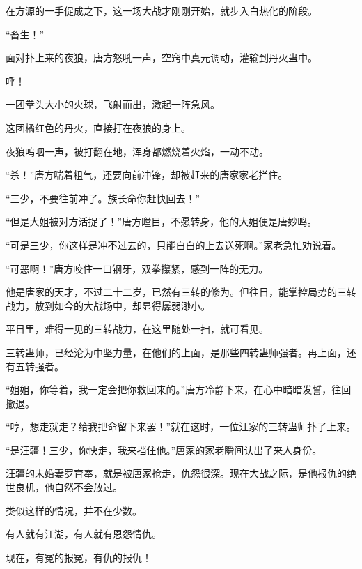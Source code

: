 \begin{this_body}
在方源的一手促成之下，这一场大战才刚刚开始，就步入白热化的阶段。

“畜生！”

面对扑上来的夜狼，唐方怒吼一声，空窍中真元调动，灌输到丹火蛊中。

呼！

一团拳头大小的火球，飞射而出，激起一阵急风。

这团橘红色的丹火，直接打在夜狼的身上。

夜狼呜咽一声，被打翻在地，浑身都燃烧着火焰，一动不动。

“杀！”唐方喘着粗气，还要向前冲锋，却被赶来的唐家家老拦住。

“三少，不要往前冲了。族长命你赶快回去！”

“但是大姐被对方活捉了！”唐方瞠目，不愿转身，他的大姐便是唐妙鸣。

“可是三少，你这样是冲不过去的，只能白白的上去送死啊。”家老急忙劝说着。

“可恶啊！”唐方咬住一口钢牙，双拳攥紧，感到一阵的无力。

他是唐家的天才，不过二十二岁，已然有三转的修为。但往日，能掌控局势的三转战力，放到如今的大战场中，却显得孱弱渺小。

平日里，难得一见的三转战力，在这里随处一扫，就可看见。

三转蛊师，已经沦为中坚力量，在他们的上面，是那些四转蛊师强者。再上面，还有五转强者。

“姐姐，你等着，我一定会把你救回来的。”唐方冷静下来，在心中暗暗发誓，往回撤退。

“哼，想走就走？给我把命留下来罢！”就在这时，一位汪家的三转蛊师扑了上来。

“是汪疆！三少，你快走，我来挡住他。”唐家的家老瞬间认出了来人身份。

汪疆的未婚妻罗育奉，就是被唐家抢走，仇怨很深。现在大战之际，是他报仇的绝世良机，他自然不会放过。

类似这样的情况，并不在少数。

有人就有江湖，有人就有恩怨情仇。

现在，有冤的报冤，有仇的报仇！

\end{this_body}

